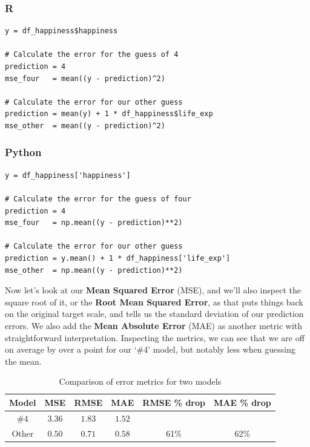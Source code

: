 \documentclass[
  letterpaper,
]{krantz}
\begin{document}
\subsubsection{R}

\begin{verbatim}
y = df_happiness$happiness

# Calculate the error for the guess of 4
prediction = 4
mse_four   = mean((y - prediction)^2)

# Calculate the error for our other guess
prediction = mean(y) + 1 * df_happiness$life_exp
mse_other  = mean((y - prediction)^2)
\end{verbatim}

\subsubsection{Python}

\begin{verbatim}
y = df_happiness['happiness']

# Calculate the error for the guess of four
prediction = 4
mse_four   = np.mean((y - prediction)**2)

# Calculate the error for our other guess
prediction = y.mean() + 1 * df_happiness['life_exp']
mse_other  = np.mean((y - prediction)**2)
\end{verbatim}

Now let's look at our \textbf{Mean Squared Error} (MSE), and we'll also
inspect the square root of it, or the \textbf{Root Mean Squared Error},
as that puts things back on the original target scale, and tells us the
standard deviation of our prediction errors. We also add the
\textbf{Mean Absolute Error} (MAE) as another metric with
straightforward interpretation. Inspecting the metrics, we can see that
we are off on average by over a point for our `\#4' model, but notably
less when guessing the mean.

\begin{longtable}{cccccc}
\caption{Comparison of error metrics for two models}\tabularnewline

\toprule
Model & MSE & RMSE & MAE & RMSE \% drop & MAE \% drop \\ 
\midrule\addlinespace[2.5pt]
\#4 & \textcolor[HTML]{404040}{$3.36$} & \textcolor[HTML]{404040}{$1.83$} & \textcolor[HTML]{404040}{$1.52$} &  &  \\ 
Other & \textcolor[HTML]{404040}{$0.50$} & \textcolor[HTML]{404040}{$0.71$} & \textcolor[HTML]{404040}{$0.58$} & 61\% & 62\% \\ 
\bottomrule
\end{longtable}
\end{document}
